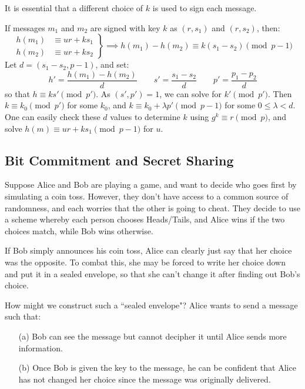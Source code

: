 \documentclass{article}
\begin{document}
\begin{proposition}
    It is essential that a different choice of $k$ is used to sign each message.
\end{proposition}

\begin{prf}
    If messages $m_1$ and $m_2$ are signed with key $k$ as $(r, s_1)$ and $(r, s_2)$, then:
	\[
	\left.\begin{aligned}
		    h(m_1) &\equiv ur + ks_1 \\
		    h(m_2) &\equiv ur + ks_2
	\end{aligned}\right\rbrace \implies
	h(m_1) - h(m_2) \equiv k(s_1 - s_2) \pmod{p-1}
	\]
	Let $d = (s_1 - s_2, p-1)$, and set:
	\[
	h' = \frac{h(m_1) - h(m_2)}{d} \qquad
	s' = \frac{s_1 - s_2}{d} \qquad
	p' = \frac{p_1 - p_2}{d}
	\]
	so that $h \equiv ks' \pmod{p'}$. As $(s', p') = 1$, we can solve for $k' \pmod{p'}$. Then $k \equiv k_0 \pmod{p'}$ for some $k_0$, and $k \equiv k_0 + \lambda p' \pmod{p-1}$ for some $0 \leq \lambda < d$. One can easily check these $d$ values to determine $k$ using $g^k \equiv r \pmod p$, and solve $h(m) \equiv ur + ks_1 \pmod{p-1}$ for $u$.
\end{prf}


\subsection{Bit Commitment and Secret Sharing}
\label{section-cryptography-bit-commitment}

Suppose Alice and Bob are playing a game, and want to decide who goes first by simulating a coin toss. However, they don't have access to a common source of randomness, and each worries that the other is going to cheat. They decide to use a scheme whereby each person chooses Heads/Tails, and Alice wins if the two choices match, while Bob wins otherwise.

If Bob simply announces his coin toss, Alice can clearly just say that her choice was the opposite. To combat this, she may be forced to write her choice down and put it in a sealed envelope, so that she can't change it after finding out Bob's choice.

How might we construct such a ``sealed envelope"? Alice wants to send a message such that:
\begin{enumerate}
    \item[(a)] Bob can see the message but cannot decipher it until Alice sends more information.
    \item[(b)] Once Bob is given the key to the message, he can be confident that Alice has not changed her choice since the message was originally delivered.
\end{enumerate}
\end{document}
